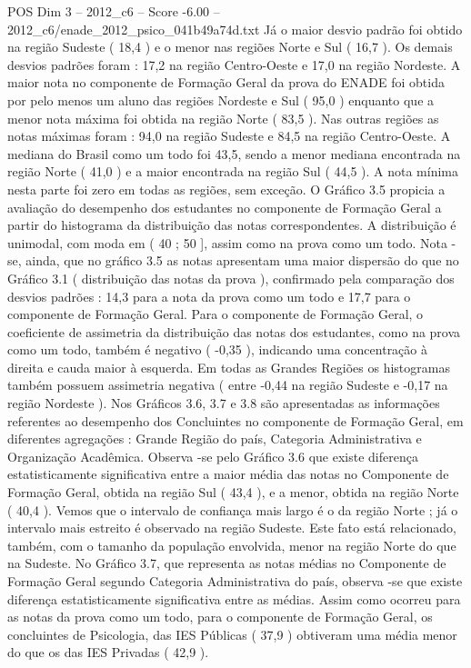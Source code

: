 \begin{textsample}{POS Dim 3 – 2012\_c6 – Score -6.00 – 2012\_c6/enade\_2012\_psico\_041b49a74d.txt}
Já o maior desvio padrão foi obtido na região Sudeste ( 18,4 ) e o menor nas regiões Norte e Sul ( 16,7 ).
Os demais desvios padrões foram : 17,2 na região Centro-Oeste e 17,0 na região Nordeste.
A maior nota no componente de Formação Geral da prova do ENADE foi obtida por pelo menos um aluno das regiões Nordeste e Sul ( 95,0 ) enquanto que a menor nota máxima foi obtida na região Norte ( 83,5 ).
Nas outras regiões as notas máximas foram : 94,0 na região Sudeste e 84,5 na região Centro-Oeste.
A mediana do Brasil como um todo foi 43,5, sendo a menor mediana encontrada na região Norte ( 41,0 ) e a maior encontrada na região Sul ( 44,5 ).
A nota mínima nesta parte foi zero em todas as regiões, sem exceção.
O Gráfico 3.5 propicia a avaliação do desempenho dos estudantes no componente de Formação Geral a partir do histograma da distribuição das notas correspondentes.
A distribuição é unimodal, com moda em ( 40 ; 50 ], assim como na prova como um todo.
Nota -se, ainda, que no gráfico 3.5 as notas apresentam uma maior dispersão do que no Gráfico 3.1 ( distribuição das notas da prova ), confirmado pela comparação dos desvios padrões : 14,3 para a nota da prova como um todo e 17,7 para o componente de Formação Geral.
Para o componente de Formação Geral, o coeficiente de assimetria da distribuição das notas dos estudantes, como na prova como um todo, também é negativo ( -0,35 ), indicando uma concentração à direita e cauda maior à esquerda.
Em todas as Grandes Regiões os histogramas também possuem assimetria negativa ( entre -0,44 na região Sudeste e -0,17 na região Nordeste ).
Nos Gráficos 3.6, 3.7 e 3.8 são apresentadas as informações referentes ao desempenho dos Concluintes no componente de Formação Geral, em diferentes agregações : Grande Região do país, Categoria Administrativa e Organização Acadêmica.
Observa -se pelo Gráfico 3.6 que existe diferença estatisticamente significativa entre a maior média das notas no Componente de Formação Geral, obtida na região Sul ( 43,4 ), e a menor, obtida na região Norte ( 40,4 ).
Vemos que o intervalo de confiança mais largo é o da região Norte ; já o intervalo mais estreito é observado na região Sudeste.
Este fato está relacionado, também, com o tamanho da população envolvida, menor na região Norte do que na Sudeste.
No Gráfico 3.7, que representa as notas médias no Componente de Formação Geral segundo Categoria Administrativa do país, observa -se que existe diferença estatisticamente significativa entre as médias.
Assim como ocorreu para as notas da prova como um todo, para o componente de Formação Geral, os concluintes de Psicologia, das IES Públicas ( 37,9 ) obtiveram uma média menor do que os das IES Privadas ( 42,9 ).

\end{textsample}
